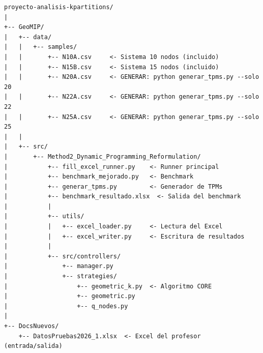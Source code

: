 \documentclass[12pt,a4paper]{article}
\begin{document}
\begin{lstlisting}[language={}]
proyecto-analisis-kpartitions/
|
+-- GeoMIP/
|   +-- data/
|   |   +-- samples/
|   |       +-- N10A.csv     <- Sistema 10 nodos (incluido)
|   |       +-- N15B.csv     <- Sistema 15 nodos (incluido)
|   |       +-- N20A.csv     <- GENERAR: python generar_tpms.py --solo 20
|   |       +-- N22A.csv     <- GENERAR: python generar_tpms.py --solo 22
|   |       +-- N25A.csv     <- GENERAR: python generar_tpms.py --solo 25
|   |
|   +-- src/
|       +-- Method2_Dynamic_Programming_Reformulation/
|           +-- fill_excel_runner.py    <- Runner principal
|           +-- benchmark_mejorado.py   <- Benchmark
|           +-- generar_tpms.py         <- Generador de TPMs
|           +-- benchmark_resultado.xlsx  <- Salida del benchmark
|           |
|           +-- utils/
|           |   +-- excel_loader.py     <- Lectura del Excel
|           |   +-- excel_writer.py     <- Escritura de resultados
|           |
|           +-- src/controllers/
|               +-- manager.py
|               +-- strategies/
|                   +-- geometric_k.py  <- Algoritmo CORE
|                   +-- geometric.py
|                   +-- q_nodes.py
|
+-- DocsNuevos/
    +-- DatosPruebas2026_1.xlsx  <- Excel del profesor (entrada/salida)
\end{lstlisting}
\end{document}

